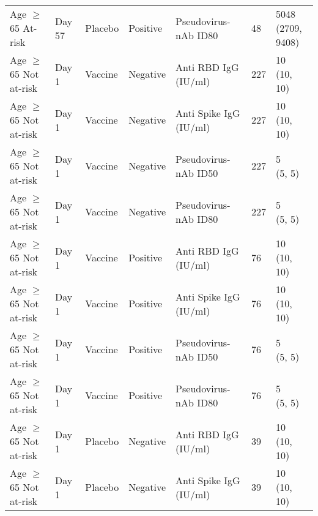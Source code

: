 \documentclass[]{book}
\theoremstyle{definition}
\theoremstyle{definition}
\theoremstyle{definition}
\newcommand{\1}{\mathbbm{1}}
\begin{document}
\begin{landscape}
\begin{ThreePartTable}
\begin{longtable}[t]{>{\raggedright\arraybackslash}p{7cm}llllll}
\hspace{1em}Age $\geq$ 65 At-risk & Day 57 & Placebo & Positive & Pseudovirus-nAb ID80 & 48 & \makecell[l]{5048\\(2709, 9408)}\\
\hspace{1em}Age $\geq$ 65 Not at-risk & Day 1 & Vaccine & Negative & Anti RBD IgG (IU/ml) & 227 & \makecell[l]{10\\(10, 10)}\\
\hspace{1em}Age $\geq$ 65 Not at-risk & Day 1 & Vaccine & Negative & Anti Spike IgG (IU/ml) & 227 & \makecell[l]{10\\(10, 10)}\\
\hspace{1em}Age $\geq$ 65 Not at-risk & Day 1 & Vaccine & Negative & Pseudovirus-nAb ID50 & 227 & \makecell[l]{5\\(5, 5)}\\
\hspace{1em}Age $\geq$ 65 Not at-risk & Day 1 & Vaccine & Negative & Pseudovirus-nAb ID80 & 227 & \makecell[l]{5\\(5, 5)}\\
\hspace{1em}Age $\geq$ 65 Not at-risk & Day 1 & Vaccine & Positive & Anti RBD IgG (IU/ml) & 76 & \makecell[l]{10\\(10, 10)}\\
\hspace{1em}Age $\geq$ 65 Not at-risk & Day 1 & Vaccine & Positive & Anti Spike IgG (IU/ml) & 76 & \makecell[l]{10\\(10, 10)}\\
\hspace{1em}Age $\geq$ 65 Not at-risk & Day 1 & Vaccine & Positive & Pseudovirus-nAb ID50 & 76 & \makecell[l]{5\\(5, 5)}\\
\hspace{1em}Age $\geq$ 65 Not at-risk & Day 1 & Vaccine & Positive & Pseudovirus-nAb ID80 & 76 & \makecell[l]{5\\(5, 5)}\\
\hspace{1em}Age $\geq$ 65 Not at-risk & Day 1 & Placebo & Negative & Anti RBD IgG (IU/ml) & 39 & \makecell[l]{10\\(10, 10)}\\
\hspace{1em}Age $\geq$ 65 Not at-risk & Day 1 & Placebo & Negative & Anti Spike IgG (IU/ml) & 39 & \makecell[l]{10\\(10, 10)}\\

\end{longtable}
\end{ThreePartTable}
\end{landscape}
\end{document}
